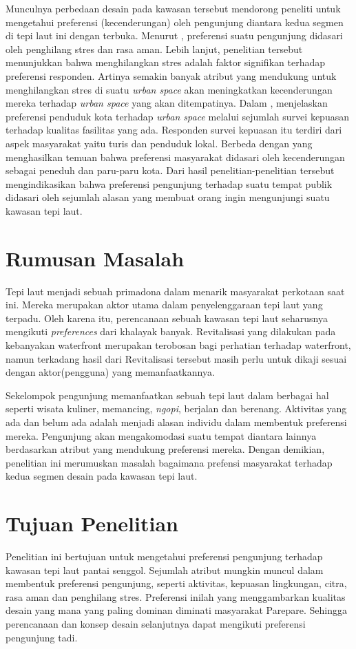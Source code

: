 \documentclass[../projects/thesis.tex]{subfiles}
\begin{document}
Munculnya perbedaan desain pada kawasan tersebut mendorong peneliti untuk mengetahui preferensi (kecenderungan) oleh pengunjung diantara kedua segmen di tepi laut ini dengan terbuka. Menurut \cite{thomas2020}, preferensi suatu pengunjung didasari oleh penghilang stres dan rasa aman. Lebih lanjut, penelitian tersebut menunjukkan bahwa menghilangkan stres adalah faktor signifikan terhadap preferensi responden. Artinya semakin banyak atribut yang mendukung untuk menghilangkan stres di suatu \textit{urban space} akan meningkatkan kecenderungan mereka terhadap \textit{urban space} yang akan ditempatinya.
Dalam \citep{wang2020}, menjelaskan preferensi penduduk kota terhadap \textit{urban space} melalui sejumlah survei kepuasan terhadap kualitas fasilitas yang ada. Responden survei kepuasan itu terdiri dari aspek masyarakat yaitu turis dan penduduk lokal.
Berbeda dengan \cite{imansari2015} yang menghasilkan temuan bahwa preferensi masyarakat didasari oleh kecenderungan sebagai peneduh dan paru-paru kota.
Dari hasil penelitian-penelitian tersebut mengindikasikan bahwa preferensi pengunjung terhadap suatu tempat publik didasari oleh sejumlah alasan yang membuat orang ingin mengunjungi suatu kawasan tepi laut.

\section{Rumusan Masalah}
Tepi laut menjadi sebuah primadona dalam menarik masyarakat perkotaan saat ini. Mereka merupakan aktor utama dalam penyelenggaraan tepi laut yang terpadu. Oleh karena itu, perencanaan sebuah kawasan tepi laut seharusnya mengikuti \textit{preferences} dari khalayak banyak. Revitalisasi yang dilakukan pada kebanyakan waterfront merupakan terobosan bagi perhatian terhadap waterfront, namun terkadang hasil dari Revitalisasi tersebut masih perlu untuk dikaji sesuai dengan aktor(pengguna) yang memanfaatkannya.

Sekelompok pengunjung memanfaatkan sebuah tepi laut dalam berbagai hal seperti wisata kuliner, memancing, \textit{ngopi}, berjalan dan berenang.
Aktivitas yang ada dan belum ada adalah menjadi alasan individu dalam membentuk preferensi mereka. Pengunjung akan mengakomodasi suatu tempat diantara lainnya berdasarkan atribut yang mendukung preferensi mereka. Dengan demikian, penelitian ini merumuskan masalah bagaimana prefensi masyarakat terhadap kedua segmen desain pada kawasan tepi laut.

\section{Tujuan Penelitian}
Penelitian ini bertujuan untuk mengetahui preferensi pengunjung terhadap kawasan tepi laut pantai senggol. Sejumlah atribut mungkin muncul dalam membentuk preferensi pengunjung, seperti aktivitas, kepuasan lingkungan, citra, rasa aman dan penghilang stres.
Preferensi inilah yang menggambarkan kualitas desain yang mana yang paling dominan diminati masyarakat Parepare. Sehingga perencanaan dan konsep desain selanjutnya dapat mengikuti preferensi pengunjung tadi.
\end{document}
